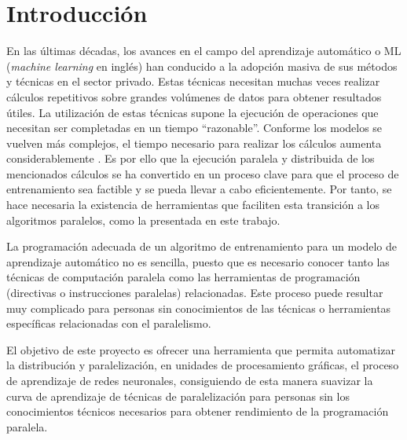%


\chapter{Introducción}

En las últimas décadas, los avances en el campo del aprendizaje automático o ML (\textit{machine learning} en inglés)
han conducido a la adopción masiva de sus métodos y técnicas en el sector privado. Estas técnicas necesitan muchas veces 
realizar cálculos repetitivos sobre grandes volúmenes de datos para obtener resultados útiles. La utilización de estas 
técnicas supone la ejecución de operaciones que necesitan ser completadas en un tiempo ``razonable''. Conforme los 
modelos se vuelven más complejos, el tiempo necesario para realizar los cálculos aumenta considerablemente 
\cite{wilkinson_allen_2005}. Es por ello que la ejecución paralela y distribuida de los mencionados cálculos se ha 
convertido en un proceso clave para que el proceso de entrenamiento sea factible y se pueda llevar a cabo 
eficientemente. Por tanto, se hace necesaria la existencia de herramientas que faciliten esta transición a los algoritmos
paralelos, como la presentada en este trabajo.

\vspace{10pt}
La programación adecuada de un algoritmo de entrenamiento para un modelo de aprendizaje automático no es sencilla, puesto 
que es necesario conocer tanto las técnicas de computación paralela como las herramientas de programación (directivas o 
instrucciones paralelas) relacionadas. Este proceso puede resultar muy complicado para personas sin conocimientos de las 
técnicas o herramientas específicas relacionadas con el paralelismo.

\vspace{10pt}
El objetivo de este proyecto es ofrecer una herramienta que permita automatizar la distribución y paralelización, en 
unidades de procesamiento gráficas, el proceso de aprendizaje de redes neuronales, consiguiendo de esta manera 
suavizar la curva de aprendizaje de técnicas de paralelización para personas sin los conocimientos técnicos necesarios
para obtener rendimiento de la programación paralela. 

